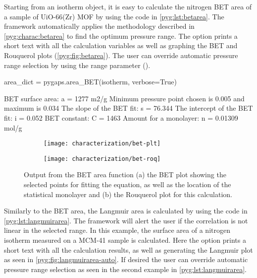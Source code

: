 Starting from an isotherm object, it is easy to
calculate the nitrogen BET area of a sample of UiO-66(Zr) MOF
by using the code in \autoref{pyg:lst:betarea}.
The framework automatically applies the methodology described in
\autoref{pyg:charac:betarea} to find the optimum pressure range. 
The  option prints a short
text with all the calculation variables as well as graphing the
BET and Rouquerol plots (\autoref{pyg:fig:betarea}).
The user can override automatic pressure range selection by using the
range parameter ().

\begin{samepage}
	\begin{python}[caption={Calculating a BET area},label={pyg:lst:betarea}]
area_dict = pygaps.area_BET(isotherm, verbose=True)
\end{python}
	\begin{pythonout}
BET surface area: a = 1277 m2/g
Minimum pressure point chosen is 0.005 and maximum is 0.034
The slope of the BET fit: 		s = 76.344
The intercept of the BET fit: 	i = 0.052
BET constant: 					C = 1463
Amount for a monolayer: 		n = 0.01309 mol/g
\end{pythonout}
\end{samepage}

\begin{figure}[!htb]
	\centering

	\begin{subfigure}{0.45\linewidth}
		\parbox[c]{0.1\linewidth}{\caption{}%
			\label{pyg:fig:betarea-plt}}
		\parbox[b]{0.85\linewidth}{%
			\texttt{[image: characterization/bet-plt]}}
	\end{subfigure}%
	\begin{subfigure}{0.45\linewidth}
		\parbox[c]{0.1\linewidth}{\caption{}%
			\label{pyg:fig:betarea-roq}}
		\parbox[b]{0.85\linewidth}{%
			\texttt{[image: characterization/bet-roq]}}
	\end{subfigure}%

	\caption{Output from the BET area function (a) the BET plot showing
		the selected points for fitting the equation, as well as the location
		of the statistical monolayer and (b) the Rouquerol plot for this
		calculation.}%
	\label{pyg:fig:betarea}

\end{figure}

Similarly to the BET area, the Langmuir area is calculated by using
the code in \autoref{pyg:lst:langmuirarea}. The framework will alert
the user if the correlation is not linear in the selected range.
In this example, the surface area of a nitrogen isotherm measured 
on a MCM-41 sample is calculated.
Here the  option prints a short
text with all the calculation results, as well as generating the
Langmuir plot as seen in \autoref{pyg:fig:langmuirarea-auto}.
If desired the user can override automatic pressure range selection
as seen in the second example in \autoref{pyg:lst:langmuirarea}.

